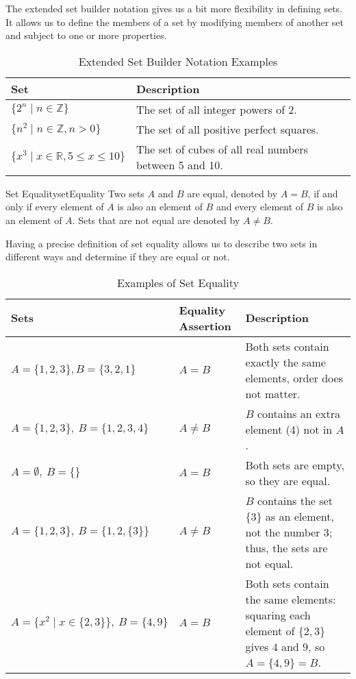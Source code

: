 The extended set builder notation gives us a bit more flexibility in defining sets. It allows us
to define the members of a set by modifying members of another set and subject to one
or more properties.

\begin{table}[H]
  \centering
  \begin{tabular}{p{2in} p{3in}}
    \toprule
    \textbf{Set} & \textbf{Description} \\
    \midrule
    \( \{ 2^n \mid n \in \mathbb{Z} \} \) & The set of all integer powers of 2. \\
    \( \{ n^2 \mid n \in \mathbb{Z}, n > 0 \} \) & The set of all positive perfect squares. \\
    \( \{ x^3 \mid x \in \mathbb{R}, 5 \le x \le 10 \} \) &
      The set of cubes of all real numbers between 5 and 10. \\
    \bottomrule
  \end{tabular}
  \caption{Extended Set Builder Notation Examples}
\end{table}

\begin{definition}{Set Equality}{setEquality}
  Two sets \( A \) and \( B \) are equal, denoted by \( A = B \), if and only if
  every element of \( A \) is also an element of \( B \) and every element of \( B \)
  is also an element of \( A \). Sets that are not equal are denoted by \( A \neq B \).
\end{definition}

Having a precise definition of set equality allows us to describe two sets in different
ways and determine if they are equal or not.

\begin{table}[H]
  \centering
  \begin{tabular}{p{2in} p{0.75in} p{2.25in}}
    \toprule
    \textbf{Sets} & \textbf{Equality \newline Assertion} & \textbf{Description} \\
    \midrule
    \( A = \{ 1, 2, 3 \}, B = \{ 3, 2, 1 \} \) & \( A = B \) & Both sets contain exactly the same elements, order does not matter. \\
    \( A = \{ 1, 2, 3 \},\ B = \{ 1, 2, 3, 4 \} \) & \( A \neq B \) & \( B \) contains an extra element (4) not in \( A \). \\
    \( A = \emptyset,\ B = \{ \} \) & \( A = B \) & Both sets are empty, so they are equal. \\
    \( A = \{ 1, 2, 3 \},\ B = \{ 1, 2, \{3\} \} \) & \( A \neq B \) &
      \( B \) contains the set \( \{3\} \) as an element, not the number \( 3 \); thus, the sets are not equal. \\
    \( A = \{ x^2 \mid x \in \{ 2, 3 \} \},\ B = \{ 4, 9 \} \) & \( A = B \) & Both sets contain the same elements: squaring each
      element of \( \{2, 3\} \) gives \( 4 \) and \( 9 \), so \( A = \{4, 9\} = B \). \\
    \bottomrule
  \end{tabular}
  \caption{Examples of Set Equality}
\end{table}

